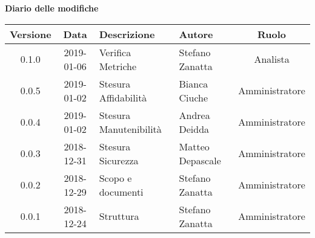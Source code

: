 	\begin{center}
		\textbf{Diario delle modifiche}
	\end{center}
	\begin{center}
		\begin{tabularx}{\textwidth}{|c|c|X|X|c|}
			\hline
			\textbf{Versione} & \textbf{Data} & \textbf{Descrizione} & \textbf{Autore} & \textbf{Ruolo} \\
			\hline
			0.1.0 & 2019-01-06 & Verifica Metriche & Stefano Zanatta & Analista\\
			0.0.5 & 2019-01-02 & Stesura Affidabilità & Bianca Ciuche & Amministratore\\
			0.0.4 & 2019-01-02 & Stesura Manutenibilità & Andrea Deidda & Amministratore\\
			0.0.3 & 2018-12-31 & Stesura Sicurezza & Matteo Depascale & Amministratore\\
			0.0.2 & 2018-12-29 & Scopo e documenti & Stefano Zanatta & Amministratore\\
			0.0.1 & 2018-12-24 & Struttura & Stefano Zanatta & Amministratore\\
			\hline
		\end{tabularx}
	\end{center}
\newpage